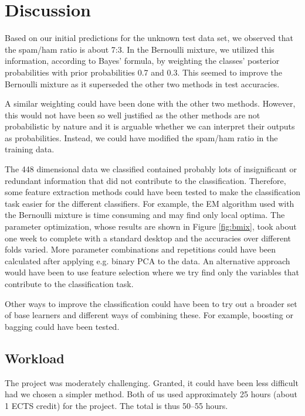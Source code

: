 \section{Discussion} \label{sec:discussion}

Based on our initial predictions for the unknown test data set, we observed that the spam/ham ratio is about 7:3. In the Bernoulli mixture, we utilized this information, according to Bayes' formula, by weighting the classes' posterior probabilities with prior probabilities 0.7 and 0.3. This seemed to improve the Bernoulli mixture as it superseded the other two methods in test accuracies.

A similar weighting could have been done with the other two methods. However, this would not have been so well justified as the other methods are not probabilistic by nature and it is arguable whether we can interpret their outputs as probabilities. Instead, we could have modified the spam/ham ratio in the training data. 

The 448 dimensional data we classified contained probably lots of insignificant or redundant information that did not contribute to the classification. Therefore, some feature extraction methods could have been tested to make the classification task easier for the different classifiers. For example, the EM algorithm used with the Bernoulli mixture is time consuming and may find only local optima. The parameter optimization, whose results are shown in Figure \ref{fig:bmix}, took about one week to complete with a standard desktop and the accuracies over different folds varied. More parameter combinations and repetitions could have been calculated after applying e.g. binary PCA to the data. An alternative approach would have been to use feature selection where we try find only the variables that contribute to the classification task.

Other ways to improve the classification could have been to try out a broader set of base learners and different ways of combining these. For example, boosting or bagging could have been tested.

\subsection{Workload}

The project was moderately challenging. Granted, it could have been less difficult had we chosen a simpler method. Both of us used approximately 25 hours (about 1 ECTS credit) for the project. The total is thus 50--55 hours.

